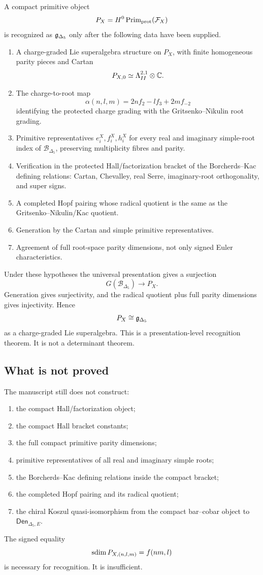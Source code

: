 A compact primitive object
\[
P_X=H^0\operatorname{Prim}_{\mathrm{prot}}(\mathcal F_X)
\]
is recognized as \(\mathfrak g_{\Delta_5}\) only after the following data have been
supplied.
\begin{enumerate}
\item A charge-graded Lie superalgebra structure on \(P_X\), with finite
homogeneous parity pieces and Cartan
\[
P_{X,0}\simeq\Lambda^{2,1}_{II}\otimes\mathbb C .
\]
\item The charge-to-root map
\[
\alpha(n,l,m)=2nf_2-lf_3+2mf_{-2}
\]
identifying the protected charge grading with the
Gritsenko--Nikulin root grading.
\item Primitive representatives \(e_i^X,f_i^X,h_i^X\) for every real and
imaginary simple-root index of \(\mathscr B_{\Delta_5}\), preserving
multiplicity fibres and parity.
\item Verification in the protected Hall/factorization bracket of the
Borcherds--Kac defining relations: Cartan, Chevalley, real Serre,
imaginary-root orthogonality, and super signs.
\item A completed Hopf pairing whose radical quotient is the same as the
Gritsenko--Nikulin/Kac quotient.
\item Generation by the Cartan and simple primitive representatives.
\item Agreement of full root-space parity dimensions, not only signed
Euler characteristics.
\end{enumerate}
Under these hypotheses the universal presentation gives a surjection
\[
G(\mathscr B_{\Delta_5})\longrightarrow P_X .
\]
Generation gives surjectivity, and the radical quotient plus full parity
dimensions gives injectivity.  Hence
\[
P_X\cong\mathfrak g_{\Delta_5}
\]
as a charge-graded Lie superalgebra.  This is a presentation-level
recognition theorem.  It is not a determinant theorem.

\subsection{What is not proved}

The manuscript still does not construct:
\begin{enumerate}
\item the compact Hall/factorization object;
\item the compact Hall bracket constants;
\item the full compact primitive parity dimensions;
\item primitive representatives of all real and imaginary simple roots;
\item the Borcherds--Kac defining relations inside the compact bracket;
\item the completed Hopf pairing and its radical quotient;
\item the chiral Koszul quasi-isomorphism from the compact bar--cobar
object to \(\mathsf{Den}_{\Delta_5,E}\).
\end{enumerate}
The signed equality
\[
\operatorname{sdim} P_{X,(n,l,m)}=f(nm,l)
\]
is necessary for recognition.  It is insufficient.


